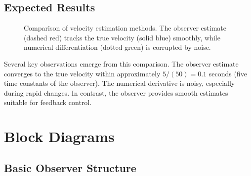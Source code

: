 \subsection{Expected Results}

\begin{figure}[ht]
\centering
{}
\caption{Comparison of velocity estimation methods. The observer estimate (dashed red) tracks the true velocity (solid blue) smoothly, while numerical differentiation (dotted green) is corrupted by noise.}
\label{fig:observer_comparison}
\end{figure}

Several key observations emerge from this comparison. The observer estimate converges to the true velocity within approximately $5/(50) = 0.1$ seconds (five time constants of the observer). The numerical derivative is noisy, especially during rapid changes. In contrast, the observer provides smooth estimates suitable for feedback control.

\section{Block Diagrams}

\subsection{Basic Observer Structure}

